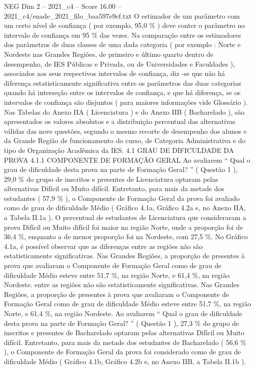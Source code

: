 \begin{textsample}{NEG Dim 2 – 2021\_c4 – Score 16.00 – 2021\_c4/enade\_2021\_filo\_baa597e9cf.txt}
O estimador de um parâmetro com um certo nível de confiança ( por exemplo, 95,0 \% ) deve conter o parâmetro no intervalo de confiança em 95 \% das vezes.
Na comparação entre os estimadores dos parâmetros de duas classes de uma dada categoria ( por exemplo : Norte e Nordeste nas Grandes Regiões, de primeiro e último quarto dentro de desempenho, de IES Públicas e Privada, ou de Universidades e Faculdades ), associados aos seus respectivos intervalos de confiança, diz -se que não há diferença estatisticamente significativa entre os parâmetros das duas categorias quando há interseção entre os intervalos de confiança, e que há diferença, se os intervalos de confiança são disjuntos ( para maiores informações vide Glossário ).
Nas Tabelas do Anexo IIA ( Licenciatura ) e do Anexo IIB ( Bacharelado ), são apresentados os valores absolutos e a distribuição percentual das alternativas válidas das nove questões, segundo o mesmo recorte de desempenho dos alunos e da Grande Região de funcionamento do curso, de Categoria Administrativa e do tipo de Organização Acadêmica da IES. 4.1 GRAU DE DIFICULDADE DA PROVA 4.1.1 COMPONENTE DE FORMAÇÃO GERAL Ao avaliarem “ Qual o grau de dificuldade desta prova na parte de Formação Geral? ” ( Questão 1 ), 29,0 \% do grupo de inscritos e presentes de Licenciatura optaram pelas alternativas Difícil ou Muito difícil.
Entretanto, para mais da metade dos estudantes ( 57,9 \% ), o Componente de Formação Geral da prova foi avaliado como de grau de dificuldade Médio ( Gráfico 4.1a, Gráfico 4.2a e, no Anexo IIA, a Tabela II.1a ).
O percentual de estudantes de Licenciatura que consideraram a prova Difícil ou Muito difícil foi maior na região Norte, onde a proporção foi de 36,4 \%, enquanto a de menor proporção foi na Nordeste, com 27,5 \%.
No Gráfico 4.1a, é possível observar que as diferenças entre as regiões não são estatisticamente significativas.
Nas Grandes Regiões, a proporção de presentes à prova que avaliaram o Componente de Formação Geral como de grau de dificuldade Médio esteve entre 51,7 \%, na região Norte, e 61,4 \%, na região Nordeste. entre as regiões não são estatisticamente significativas.
Nas Grandes Regiões, a proporção de presentes à prova que avaliaram o Componente de Formação Geral como de grau de dificuldade Médio esteve entre 51,7 \%, na região Norte, e 61,4 \%, na região Nordeste.
Ao avaliarem “ Qual o grau de dificuldade desta prova na parte de Formação Geral? ” ( Questão 1 ), 27,3 \% do grupo de inscritos e presentes de Bacharelado optaram pelas alternativas Difícil ou Muito difícil.
Entretanto, para mais da metade dos estudantes de Bacharelado ( 56,6 \% ), o Componente de Formação Geral da prova foi considerado como de grau de dificuldade Médio ( Gráfico 4.1b, Gráfico 4.2b e, no Anexo IIB, a Tabela II.1b ).

\end{textsample}
